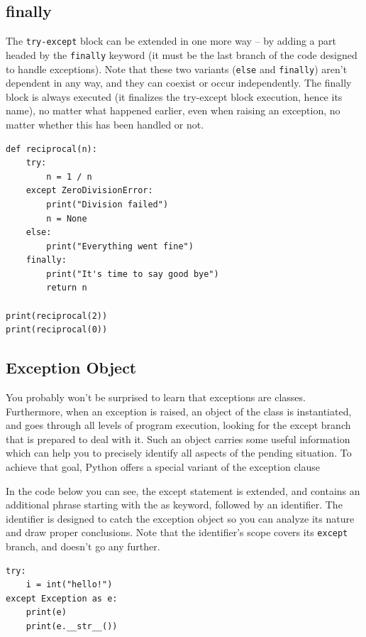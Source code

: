 \documentclass[11pt]{article}
\begin{document}
\subsection{finally}
\label{sec:orgb20e710}
The \texttt{try-except} block can be extended in one more way – by adding a
part headed by the \texttt{finally} keyword (it must be the last branch of
the code designed to handle exceptions). Note that these two variants
(\texttt{else} and \texttt{finally}) aren’t dependent in any way, and they can
coexist or occur independently. The finally block is always executed
(it finalizes the try-except block execution, hence its name), no
matter what happened earlier, even when raising an exception, no
matter whether this has been handled or not.

\begin{verbatim}
def reciprocal(n):
	try:
		n = 1 / n
	except ZeroDivisionError:
		print("Division failed")
		n = None
	else:
		print("Everything went fine")
	finally:
		print("It's time to say good bye")
		return n

print(reciprocal(2))
print(reciprocal(0))
\end{verbatim}

\subsection{Exception Object}
\label{sec:org57473d3}
You probably won’t be surprised to learn that exceptions are
classes. Furthermore, when an exception is raised, an object of the
class is instantiated, and goes through all levels of program
execution, looking for the except branch that is prepared to deal with
it.  Such an object carries some useful information which can help you
to precisely identify all aspects of the pending situation. To achieve
that goal, Python offers a special variant of the exception clause

In the code below you can see, the except statement is extended, and
contains an additional phrase starting with the as keyword, followed
by an identifier. The identifier is designed to catch the exception
object so you can analyze its nature and draw proper conclusions. Note
that the identifier’s scope covers its \texttt{except} branch, and doesn’t go
any further.

\begin{verbatim}
try:
	i = int("hello!")
except Exception as e:
	print(e)
	print(e.__str__())

\end{verbatim}
\end{document}
